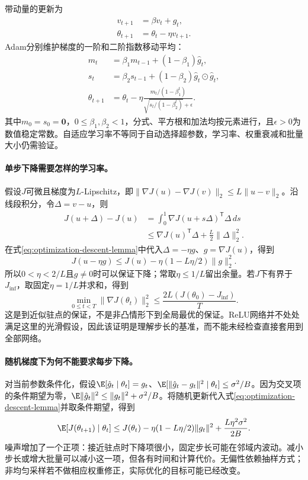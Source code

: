 带动量的更新为
\begin{align}
 v_{t+1}&=\beta v_t+\hat g_t,\\
 \theta_{t+1}&=\theta_t-\eta v_{t+1}.
\end{align}
Adam分别维护梯度的一阶和二阶指数移动平均：
\begin{align}
 m_t&=\beta_1m_{t-1}+(1-\beta_1)\hat g_t,\\
 s_t&=\beta_2s_{t-1}+(1-\beta_2)\hat g_t\odot\hat g_t,\\
 \theta_{t+1}&=\theta_t-\eta\frac{m_t/(1-\beta_1^t)}{\sqrt{s_t/(1-\beta_2^t)}+\epsilon}.
\end{align}
其中$m_0=s_0=\mathbf0$，$0\leq\beta_1,\beta_2<1$，分式、平方根和加法均按元素进行，且$\epsilon>0$为数值稳定常数。自适应学习率不等同于自动选择超参数，学习率、权重衰减和批量大小仍需验证。

\paragraph{单步下降需要怎样的学习率。}
假设$J$可微且梯度为$L$-Lipschitz，即$\|\nabla J(u)-\nabla J(v)\|_2\leq L\|u-v\|_2$。沿线段积分，令$\Delta=v-u$，则
\begin{align}
 J(u+\Delta)-J(u)
 &=\int_0^1\nabla J(u+s\Delta)^{\mathsf T}\Delta\,ds\\
 &\leq\nabla J(u)^{\mathsf T}\Delta+\frac L2\|\Delta\|_2^2.\label{eq:optimization-descent-lemma}
\end{align}
在式\eqref{eq:optimization-descent-lemma}中代入$\Delta=-\eta g$、$g=\nabla J(u)$，得到
\begin{equation}
 J(u-\eta g)\leq J(u)-\eta(1-L\eta/2)\|g\|_2^2.
\end{equation}
所以$0<\eta<2/L$且$g\ne0$时可以保证下降；常取$\eta\leq1/L$留出余量。若$J$下有界于$J_{\inf}$，取固定$\eta=1/L$并求和，得到
\begin{equation}
 \min_{0\leq t<T}\|\nabla J(\theta_t)\|_2^2
 \leq\frac{2L(J(\theta_0)-J_{\inf})}{T}.
\end{equation}
这是到近似驻点的保证，不是非凸情形下到全局最优的保证。ReLU网络并不处处满足这里的光滑假设，因此该证明是理解步长的基准，而不能未经检查直接套用到全部网络。

\paragraph{随机梯度下为何不能要求每步下降。}
对当前参数条件化，假设$\E[\hat g_t\mid\theta_t]=g_t$、$\E[\|\hat g_t-g_t\|^2\mid\theta_t]\leq\sigma^2/B$。因为交叉项的条件期望为零，$\E\|\hat g_t\|^2\leq\|g_t\|^2+\sigma^2/B$。将随机更新代入式\eqref{eq:optimization-descent-lemma}并取条件期望，得到
\begin{equation}
 \E[J(\theta_{t+1})\mid\theta_t]
 \leq J(\theta_t)-\eta(1-L\eta/2)\|g_t\|^2
       +\frac{L\eta^2\sigma^2}{2B}.
\end{equation}
噪声增加了一个正项：接近驻点时下降项很小，固定步长可能在邻域内波动。减小步长或增大批量可以减小这一项，但各有时间和计算代价。无偏性依赖抽样方式；非均匀采样若不做相应权重修正，实际优化的目标可能已经改变。

